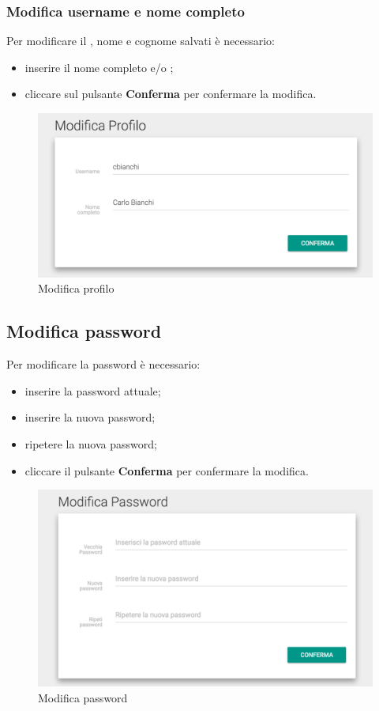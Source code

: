 \documentclass[12pt,a4paper]{article}
\begin{document}
	\subsubsection{Modifica username e nome completo}
	Per modificare il , nome e cognome salvati è necessario:
	\begin{itemize}
		\item inserire il nome completo e/o ;
		\item cliccare sul pulsante \textbf{Conferma} per confermare la modifica.
	\end{itemize}
	\begin{figure}[h]	
		\centering
		\includegraphics[width=0.8\linewidth]{../img/screenshot/user1.png}
		\caption{Modifica profilo}
		\label{Modifica profilo}
	\end{figure}

	
	\subsection{Modifica password}
	Per modificare la password  è necessario:
	\begin{itemize}
		\item inserire la password attuale;
		\item inserire la nuova password;
		\item ripetere la nuova password;
		\item cliccare il pulsante \textbf{Conferma} per confermare la modifica.
	\end{itemize}
	\begin{figure}[h]
		\centering
		\includegraphics[width=0.8\linewidth]{../img/screenshot/user2.png}
		\caption{Modifica password}
		\label{Modifica password}
	\end{figure}
	
\end{document}
